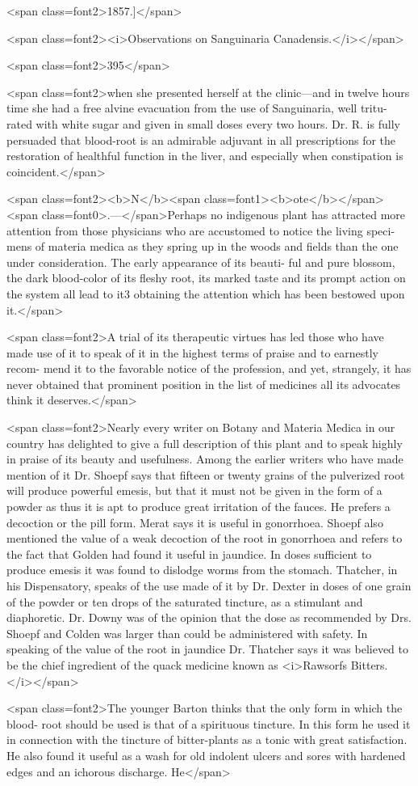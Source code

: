 <span class=font2>1857.]</span>

<span class=font2><i>Observations on Sanguinaria Canadensis.</i></span>

<span class=font2>395</span>

<span class=font2>when she presented herself at the clinic—and in twelve hours time
she had a free alvine evacuation from the use of Sanguinaria, well tritu-
rated with white sugar and given in small doses every two hours.
Dr. R. is fully persuaded that blood-root is an admirable adjuvant in
all prescriptions for the restoration of healthful function in the liver,
and especially when constipation is coincident.</span>

<span class=font2><b>N</b><span class=font1><b>ote</b></span><span class=font0>.—</span>Perhaps no indigenous plant has attracted more attention
from those physicians who are accustomed to notice the living speci-
mens of materia medica as they spring up in the woods and fields
than the one under consideration. The early appearance of its beauti-
ful and pure blossom, the dark blood-color of its fleshy root, its marked
taste and its prompt action on the system all lead to it3 obtaining the
attention which has been bestowed upon it.</span>

<span class=font2>A trial of its therapeutic virtues has led those who have made use of
it to speak of it in the highest terms of praise and to earnestly recom-
mend it to the favorable notice of the profession, and yet, strangely, it
has never obtained that prominent position in the list of medicines all
its advocates think it deserves.</span>

<span class=font2>Nearly every writer on Botany and Materia Medica in our country
has delighted to give a full description of this plant and to speak highly
in praise of its beauty and usefulness. Among the earlier writers who
have made mention of it Dr. Shoepf says that fifteen or twenty grains
of the pulverized root will produce powerful emesis, but that it must not be
given in the form of a powder as thus it is apt to produce great irritation
of the fauces. He prefers a decoction or the pill form. Merat says it
is useful in gonorrhoea. Shoepf also mentioned the value of a weak
decoction of the root in gonorrhoea and refers to the fact that Golden
had found it useful in jaundice. In doses sufficient to produce emesis
it was found to dislodge worms from the stomach. Thatcher, in his
Dispensatory, speaks of the use made of it by Dr. Dexter in doses of
one grain of the powder or ten drops of the saturated tincture, as a
stimulant and diaphoretic. Dr. Downy was of the opinion that the
dose as recommended by Drs. Shoepf and Colden was larger than could
be administered with safety. In speaking of the value of the root in
jaundice Dr. Thatcher says it was believed to be the chief ingredient
of the quack medicine known as <i>Rawsorfs Bitters.</i></span>

<span class=font2>The younger Barton thinks that the only form in which the blood-
root should be used is that of a spirituous tincture. In this form he
used it in connection with the tincture of bitter-plants as a tonic with
great satisfaction. He also found it useful as a wash for old indolent
ulcers and sores with hardened edges and an ichorous discharge. He</span>

